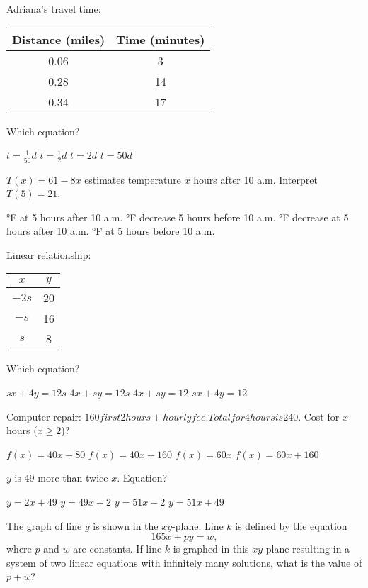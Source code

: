 \documentclass[12pt]{exam}
\begin{document}
\begin{questions}
\question Adriana's travel time:
\begin{center}
\begin{tabular}{|c|c|}
\hline
Distance (miles) & Time (minutes) \\
\hline
0.06 & 3 \\
0.28 & 14 \\
0.34 & 17 \\
\hline
\end{tabular}
\end{center}
Which equation?
\begin{choices}
\choice $t = \frac{1}{50}d$
\choice $t = \frac{1}{2}d$
\choice $t = 2d$
\choice $t = 50d$
\end{choices}

\question $T(x) = 61 - 8x$ estimates temperature $x$ hours after 10 a.m. Interpret $T(5) = 21$.
\begin{choices}
°F at 5 hours after 10 a.m.
°F decrease 5 hours before 10 a.m.
°F decrease at 5 hours after 10 a.m.
°F at 5 hours before 10 a.m.
\end{choices}

\question Linear relationship:
\begin{center}
\begin{tabular}{|c|c|}
\hline
$x$ & $y$ \\
\hline
$-2s$ & 20 \\
$-s$ & 16 \\
$s$ & 8 \\
\hline
\end{tabular}
\end{center}
Which equation?
\begin{choices}
\choice $sx + 4y = 12s$
\choice $4x + sy = 12s$
\choice $4x + sy = 12$
\choice $sx + 4y = 12$
\end{choices}

\question Computer repair: $160 first 2 hours + hourly fee. Total for 4 hours is $240. Cost for $x$ hours ($x \geq 2$)?
\begin{choices}
\choice $f(x) = 40x + 80$
\choice $f(x) = 40x + 160$
\choice $f(x) = 60x$
\choice $f(x) = 60x + 160$
\end{choices}

\question $y$ is 49 more than twice $x$. Equation?
\begin{choices}
\choice $y = 2x + 49$
\choice $y = 49x + 2$
\choice $y = 51x - 2$
\choice $y = 51x + 49$
\end{choices}

\question The graph of line $g$ is shown in the $xy$-plane. Line $k$ is defined by the equation
\[
165x + py = w,
\]
where $p$ and $w$ are constants. If line $k$ is graphed in this $xy$-plane resulting in a system of two linear equations with infinitely many solutions, what is the value of $p + w$?


\end{questions}
\end{document}
